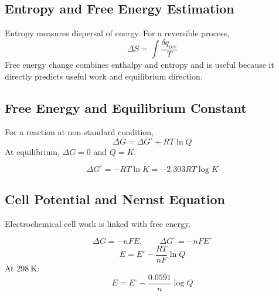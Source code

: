 \documentclass[12pt,a4paper]{article}
\begin{document}
\subsection{Entropy and Free Energy Estimation}
Entropy measures dispersal of energy. For a reversible process,
\[
\Delta S=\int\frac{\delta q_{\mathrm{rev}}}{T}
\]
Free energy change combines enthalpy and entropy and is useful because it directly predicts useful work and equilibrium direction.

\subsection{Free Energy and Equilibrium Constant}
For a reaction at non-standard condition,
\[
\Delta G=\Delta G^\circ+RT\ln Q
\]
At equilibrium, $\Delta G=0$ and $Q=K$.

\begin{tcolorbox}[formulabox, title={Relation Between Free Energy and Equilibrium Constant}]
\[
\Delta G^\circ=-RT\ln K=-2.303RT\log K
\]
\end{tcolorbox}

\subsection{Cell Potential and Nernst Equation}
Electrochemical cell work is linked with free energy.

\begin{tcolorbox}[formulabox, title={Electrochemical Free Energy}]
\[
\Delta G=-nFE,\qquad \Delta G^\circ=-nFE^\circ
\]
\[
E=E^\circ-\frac{RT}{nF}\ln Q
\]
At $298\ \mathrm{K}$:
\[
E=E^\circ-\frac{0.0591}{n}\log Q
\]
\end{tcolorbox}

\begin{tcolorbox}[tikzbox, title={Galvanic Cell and Electron Flow}]
\centering
{}
\end{tcolorbox}
\end{document}
